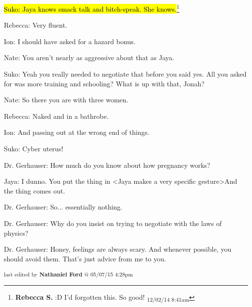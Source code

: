 \hl{Suko: Jaya knows smack talk and bitch-speak.  She knows.}\footnote{\textbf{Rebecca S. }:D  I'd forgotten this. So good! \textsubscript{12/02/14 8:41am}}

Rebecca: Very fluent.



Ion: I should have asked for a hazard bonus.

Nate: You aren't nearly as aggressive about that as Jaya.

Suko: Yeah you really needed to negotiate that before you said yes.  All you asked for was more training and schooling?  What is up with that, Jonah?



Nate: So there you are with three women.

Rebecca: Naked and in a bathrobe.

Ion: And passing out at the wrong end of things.



Suko: Cyber uterus!



Dr. Gerhauser: How much do you know about how pregnancy works?

Jaya: I dunno.  You put the thing in \textless Jaya makes a very specific gesture\textgreater  And the thing comes out.

Dr. Gerhauser: So... essentially nothing.



Dr. Gerhauser: Why do you insist on trying to negotiate with the laws of physics?



Dr. Gerhauser: Honey, feelings are always scary.  And whenever possible, you should avoid them.  That's just advice from me to you.


\iffalse

======================
THESE ARE ERRORS ENCOUNTERED DURING THE EXPORT PROCESS
======================

	Unable to highlight for footnote: I assumed through this whole scene that Dr. Gerhauser was watching everything on a security cam in her office, being mildly pissed off. because:GivenExpectedThrough the comm, Hekate says, “Are you awake?  Your baselines are good.  You are free on your own recognizance.  If find yourself suffering from any medical symptoms that are abnormal, please contact me immediately.”Through the comm, Hecate says, “Are you awake?  Your baselines are good.  You are free on your own recognizance.  If find yourself suffering from any medical symptoms that are abnormal, please contact me immediately.”


\fi

\vspace{\fill}

\begin{flushright}
\textsubscript{last edited by \textbf{Nathaniel Ford} @ 05/07/15 4:28pm}
\end{flushright}

